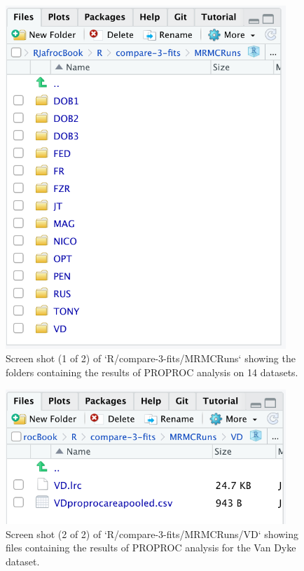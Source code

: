 \documentclass[
]{book}
\begin{document}
\begin{figure}

{\centering \includegraphics[width=300pt]{images/compare-3-fits/MRMCRuns} 

}

\caption{Screen shot (1 of 2) of `R/compare-3-fits/MRMCRuns` showing the folders containing the results of PROPROC analysis on 14 datasets.}\label{fig:rsm-3-fits-mrmc-runs}
\end{figure}

\begin{figure}

{\centering \includegraphics[width=300pt]{images/compare-3-fits/MRMCRuns-VD} 

}

\caption{Screen shot (2 of 2) of `R/compare-3-fits/MRMCRuns/VD` showing files containing the results of PROPROC analysis for the Van Dyke dataset.}\label{fig:rsm-3-fits-mrmc-runs-vd}
\end{figure}
\end{document}
